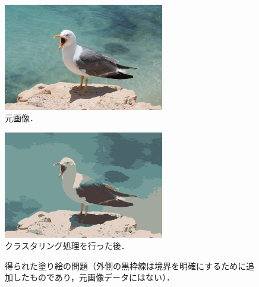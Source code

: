 \documentclass[dvipdfmx]{jsarticle}
\begin{document}
\fboxsep=0pt
\fboxrule=1pt
\begin{figure}[t]
\centering
\includegraphics[width=70mm]{kamome_PD.jpg}
\caption{\quad 元画像．}
\label{fig:original}
\end{figure}
\begin{figure}[t]
\centering
\includegraphics[width=70mm]{kamome_PD_sp32_sr16_n8_it10_ans.png}
\caption{\quad クラスタリング処理を行った後．}
\label{fig:original}
\end{figure}
\begin{figure}[t]
\centering
{}
\caption{\quad 得られた塗り絵の問題（外側の黒枠線は境界を明確にするために追加したものであり，元画像データにはない）．}
\label{fig:original}
\end{figure}

%
%
\end{document}
